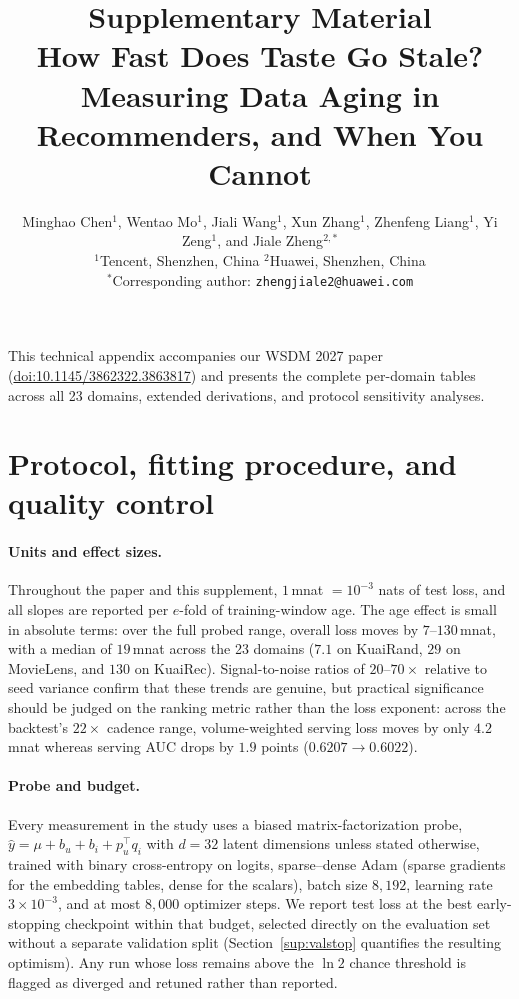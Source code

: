 \documentclass[10pt,letterpaper]{article}
\title{\vspace{-1.5em}Supplementary Material\\[0.3em]
\large How Fast Does Taste Go Stale?\\
Measuring Data Aging in Recommenders, and When You Cannot}
\author{\normalsize Minghao Chen$^{1}$, Wentao Mo$^{1}$, Jiali Wang$^{1}$, Xun Zhang$^{1}$, Zhenfeng Liang$^{1}$, Yi Zeng$^{1}$, and Jiale Zheng$^{2,\ast}$\\[0.3em]
\small $^{1}$Tencent, Shenzhen, China \qquad $^{2}$Huawei, Shenzhen, China\\[0.15em]
\small $^{\ast}$Corresponding author: \texttt{zhengjiale2@huawei.com}}
\date{}
\begin{document}
\maketitle
\vspace{-1.5em}

\noindent
This technical appendix accompanies our WSDM 2027 paper
(\href{https://doi.org/10.1145/3862322.3863817}{doi:10.1145/3862322.3863817})
and presents the complete per-domain tables across all 23 domains, extended
derivations, and protocol sensitivity analyses.

\tableofcontents
\bigskip

\section{Protocol, fitting procedure, and quality control}
\label{sup:protocol}

\paragraph{Units and effect sizes.}
Throughout the paper and this supplement, $1$\,mnat $= 10^{-3}$ nats of test
loss, and all slopes are reported per $e$-fold of training-window age. The
age effect is small in absolute terms: over the full probed range, overall
loss moves by $7$--$130$\,mnat, with a median of $19$\,mnat across the 23
domains ($7.1$ on KuaiRand, $29$ on MovieLens, and $130$ on KuaiRec).
Signal-to-noise ratios of $20$--$70\times$ relative to seed variance confirm
that these trends are genuine, but practical significance should be judged on
the ranking metric rather than the loss exponent: across the backtest's
$22\times$ cadence range, volume-weighted serving loss moves by only
$4.2$\,mnat whereas serving AUC drops by $1.9$ points ($0.6207 \to 0.6022$).

\paragraph{Probe and budget.}
Every measurement in the study uses a biased matrix-factorization probe,
$\hat y = \mu + b_u + b_i + p_u^\top q_i$ with $d = 32$ latent dimensions
unless stated otherwise, trained with binary cross-entropy on logits,
sparse--dense Adam (sparse gradients for the embedding tables, dense for the
scalars), batch size $8{,}192$, learning rate $3\times10^{-3}$, and at most
$8{,}000$ optimizer steps. We report test loss at the best early-stopping
checkpoint within that budget, selected directly on the evaluation set without a
separate validation split (Section~\ref{sup:valstop} quantifies the resulting
optimism). Any run whose loss remains above the $\ln 2$ chance threshold is
flagged as diverged and retuned rather than reported.
\end{document}

